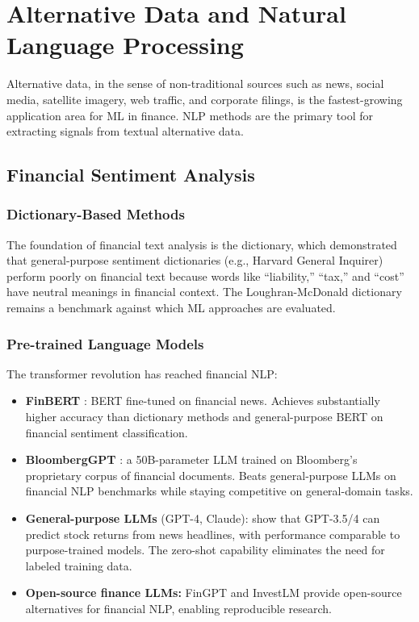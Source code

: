 \section{Alternative Data and Natural Language Processing}\label{sec:alternative_data}

Alternative data, in the sense of non-traditional sources such as news, social media, satellite imagery, web traffic, and corporate filings, is the fastest-growing application area for ML in finance. NLP methods are the primary tool for extracting signals from textual alternative data.

\subsection{Financial Sentiment Analysis}

\subsubsection{Dictionary-Based Methods}

The foundation of financial text analysis is the \citet{Loughran2011} dictionary, which demonstrated that general-purpose sentiment dictionaries (e.g., Harvard General Inquirer) perform poorly on financial text because words like ``liability,'' ``tax,'' and ``cost'' have neutral meanings in financial context. The Loughran-McDonald dictionary remains a benchmark against which ML approaches are evaluated.

\subsubsection{Pre-trained Language Models}

The transformer revolution has reached financial NLP:

\begin{itemize}[leftmargin=*]
    \item \textbf{FinBERT} \citep{Araci2019}: BERT fine-tuned on financial news. Achieves substantially higher accuracy than dictionary methods and general-purpose BERT on financial sentiment classification.

    \item \textbf{BloombergGPT} \citep{Wu2023}: a 50B-parameter LLM trained on Bloomberg's proprietary corpus of financial documents. Beats general-purpose LLMs on financial NLP benchmarks while staying competitive on general-domain tasks.

    \item \textbf{General-purpose LLMs} (GPT-4, Claude): \citet{LopezLira2023} show that GPT-3.5/4 can predict stock returns from news headlines, with performance comparable to purpose-trained models. The zero-shot capability eliminates the need for labeled training data.

    \item \textbf{Open-source finance LLMs:} FinGPT \citep{Yang2023} and InvestLM provide open-source alternatives for financial NLP, enabling reproducible research.
\end{itemize}

